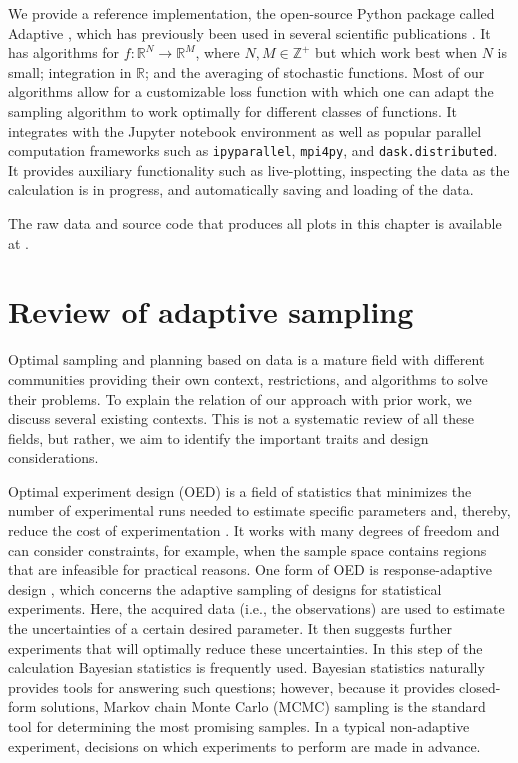 
We provide a reference implementation, the open-source Python package called Adaptive \cite{Nijholt2019}, which has previously been used in several scientific publications \cite{Vuik2018, Laeven2019, Bommer2019, Melo2019}.
It has algorithms for $f \colon \mathbb{R}^N \to \mathbb{R}^M$, where $N, M \in \mathbb{Z}^+$ but which work best when $N$ is small; integration in $\mathbb{R}$; and the averaging of stochastic functions.
Most of our algorithms allow for a customizable loss function with which one can adapt the sampling algorithm to work optimally for different classes of functions.
It integrates with the Jupyter notebook environment as well as popular parallel computation frameworks such as \passthrough{\lstinline!ipyparallel!}, \passthrough{\lstinline!mpi4py!}, and \passthrough{\lstinline!dask.distributed!}.
It provides auxiliary functionality such as live-plotting, inspecting the data as the calculation is in progress, and automatically saving and loading of the data.

The raw data and source code that produces all plots in this chapter is available at \cite{papercode}.

\hypertarget{sec:review}{%
\section{Review of adaptive sampling}\label{sec:review}}

Optimal sampling and planning based on data is a mature field with different communities providing their own context, restrictions, and algorithms to solve their problems.
To explain the relation of our approach with prior work, we discuss several existing contexts.
This is not a systematic review of all these fields, but rather, we aim to identify the important traits and design considerations.


Optimal experiment design (OED) is a field of statistics that minimizes the number of experimental runs needed to estimate specific parameters and, thereby, reduce the cost of experimentation \cite{Emery1998}.
It works with many degrees of freedom and can consider constraints, for example, when the sample space contains regions that are infeasible for practical reasons.
One form of OED is response-adaptive design \cite{Hu2006}, which concerns the adaptive sampling of designs for statistical experiments.
Here, the acquired data (i.e., the observations) are used to estimate the uncertainties of a certain desired parameter.
It then suggests further experiments that will optimally reduce these uncertainties.
In this step of the calculation Bayesian statistics is frequently used.
Bayesian statistics naturally provides tools for answering such questions; however, because it provides closed-form solutions, Markov chain Monte Carlo (MCMC) sampling is the standard tool for determining the most promising samples.
In a typical non-adaptive experiment, decisions on which experiments to perform are made in advance.

